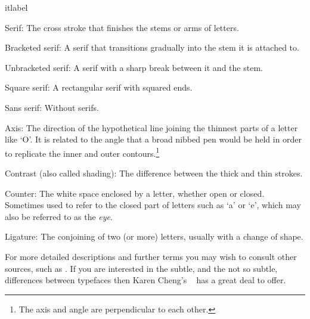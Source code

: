 \documentclass[10pt,a4paper,oneside,extrafontsizes]{memoir}%
\begin{document}
\begin{paracol}{2}
\switchEng
\begin{labelled}{itlabel}
\item[Serif:] The cross stroke that finishes the stems or arms of letters.
\item[Bracketed serif:] A serif that transitions gradually into 
     the stem it is attached to.
\item[Unbracketed serif:] A serif with a sharp break between 
      it and the stem.
\item[Square serif:] A rectangular serif with squared ends.
\item[Sans serif:] Without serifs.
\item[Axis:] The direction of the hypothetical line joining the thinnest 
             parts of a letter like `O'. It is related to the angle that
             a broad nibbed pen would be held in order to replicate the
             inner and outer contours.\footnote{The axis and angle are 
             perpendicular to each other.}
\item[Contrast (also called shading):] The 
              difference between the thick and thin strokes.
\item[Counter:] The white space enclosed by a letter, 
                whether open or closed.
                Sometimes used to refer to the closed part of letters such
                as `a' or `e', which may also be referred to as the 
               \textit{eye}.
\item[Ligature:] The conjoining of two (or more) letters, 
                 usually with a change of shape.
\end{labelled}


For more detailed descriptions and further terms
you may wish to consult other sources, such as 
\autocite{BRINGHURST99,LAWSONAGNER90,MEGGS00}. If you are interested in the
subtle, and the not so subtle, differences between typefaces then Karen 
Cheng's ~\autocite{CHENG05} has a great deal to offer.


\end{paracol}
\end{document}
